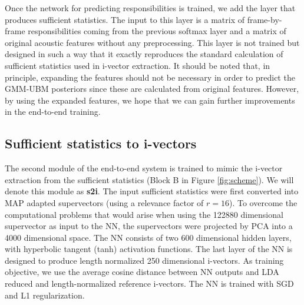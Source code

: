 \documentclass{article}
\begin{document}
Once the network for predicting responsibilities is trained, we add the layer that produces sufficient statistics. 
The input to this layer is a matrix of frame-by-frame responsibilities coming from the previous softmax layer and a matrix of original acoustic features without any preprocessing. This layer is not trained but designed in such a way that it exactly reproduces the standard calculation of sufficient statistics used in i-vector extraction. 
It should be noted that, in principle, expanding the features should not be necessary in order to predict the GMM-UBM posteriors since these are calculated from original features. However, by using the expanded features, we hope that we can gain further improvements in the end-to-end training.

\subsection{Sufficient statistics to i-vectors}
The second module of the end-to-end system is trained to mimic the i-vector extraction from the sufficient statistics (Block B in Figure \ref{fig:scheme}). We will denote this module as {\bf s2i}.
The input sufficient statistics were first converted into MAP adapted supervectors \cite{Reynolds00} (using a relevance factor of $r=16$). To overcome the computational problems that would arise when using the 122880 dimensional supervector as input to the NN, the supervectors were projected by PCA into a 4000 dimensional space. 
The NN consists of two 600 dimensional hidden layers, with hyperbolic tangent (tanh) activation functions. The last layer of the NN is designed to produce length normalized 250 dimensional i-vectors. As training objective, we use the average cosine distance between NN outputs and LDA reduced and length-normalized reference i-vectors. The NN is trained with SGD and L1 regularization.
\end{document}
